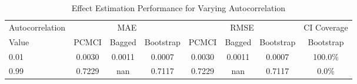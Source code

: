 \begin{table}[htbp]
\centering
\caption{Effect Estimation Performance for Varying Autocorrelation}
\label{tab:auto_performance}
\begin{tabular}{l|ccc|ccc|c}
\hline
Autocorrelation & \multicolumn{3}{c|}{MAE} & \multicolumn{3}{c|}{RMSE} & CI Coverage \\
 Value & PCMCI & Bagged & Bootstrap & PCMCI & Bagged & Bootstrap & Bootstrap \\
\hline
0.01 & 0.0030 & 0.0011 & 0.0007 & 0.0030 & 0.0011 & 0.0007 & 100.0\% \\
0.99 & 0.7229 & nan & 0.7117 & 0.7229 & nan & 0.7117 & 0.0\% \\
\hline
\end{tabular}
\end{table}
